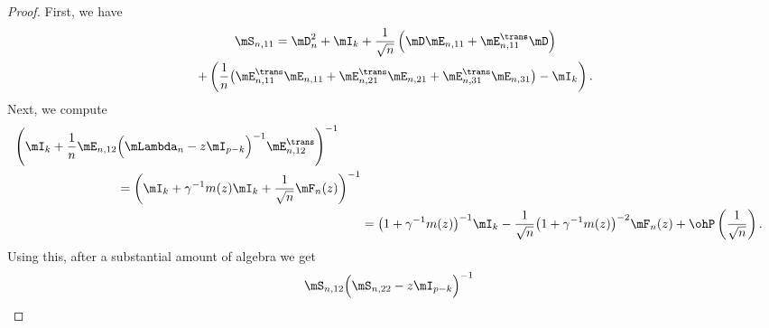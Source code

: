 \begin{proof}
    First, we have
    \begin{multline*}
        \mS_{n,11}
            = 
                \mD_n^2 + \mI_k
                +
                \frac{1}{\sqrt{n}}
                \left(
                    \mD \mE_{n,11}
                    +
                    \mE_{n,11}^\trans \mD
                \right) \\
                +
                \left(
                    \frac{1}{n}
                    \big(
                        \mE_{n,11}^\trans \mE_{n,11}
                        +
                        \mE_{n,21}^\trans \mE_{n,21}
                        +
                        \mE_{n,31}^\trans \mE_{n,31}
                    \big)
                    -
                    \mI_k
                \right).
    \end{multline*}
    Next, we compute
    \begin{align*}
        \begin{split}
        \Bigg(
            \mI_k
            +
            \frac{1}{n}
            \mE_{n,12}
            &\Big(
                \mLambda_n - z \mI_{p-k}
            \Big)^{-1}
            \mE_{n,12}^\trans
        \Bigg)^{-1} \\
            &=
                \left(
                    \mI_k
                    +
                    \gamma^{-1}
                    m( z )
                    \mI_k
                    +
                    \frac{1}{\sqrt{n}}
                    \mF_n(z)
                \right)^{-1} 
        \end{split} \\
            &=
                \big( 1 + \gamma^{-1} m(z) \big)^{-1} \mI_k
                -
                \frac{1}{\sqrt{n}}
                \big( 1 + \gamma^{-1} m(z) \big)^{-2}
                \mF_{n}(z)
                +
                \ohP\left( \frac{1}{\sqrt{n}} \right).              
    \end{align*}
    Using this, after a substantial amount of algebra we get
    \[
        \begin{split}
            \mS_{n,12} 
            &\Big( \mS_{n,22} - z \mI_{p-k} \Big)^{-1} 

\end{split}\]
\end{proof}
